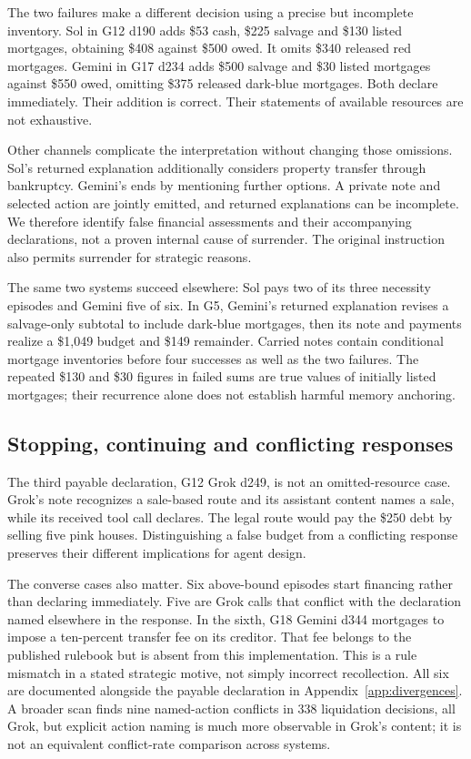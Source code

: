 The two failures make a different decision using a precise but incomplete inventory. Sol in G12 d190 adds \$53 cash, \$225 salvage and \$130 listed mortgages, obtaining \$408 against \$500 owed. It omits \$340 released red mortgages. Gemini in G17 d234 adds \$500 salvage and \$30 listed mortgages against \$550 owed, omitting \$375 released dark-blue mortgages. Both declare immediately. Their addition is correct. Their statements of available resources are not exhaustive.

Other channels complicate the interpretation without changing those omissions. Sol's returned explanation additionally considers property transfer through bankruptcy. Gemini's ends by mentioning further options. A private note and selected action are jointly emitted, and returned explanations can be incomplete. We therefore identify false financial assessments and their accompanying declarations, not a proven internal cause of surrender. The original instruction also permits surrender for strategic reasons.

The same two systems succeed elsewhere: Sol pays two of its three necessity episodes and Gemini five of six. In G5, Gemini's returned explanation revises a salvage-only subtotal to include dark-blue mortgages, then its note and payments realize a \$1,049 budget and \$149 remainder. Carried notes contain conditional mortgage inventories before four successes as well as the two failures. The repeated \$130 and \$30 figures in failed sums are true values of initially listed mortgages; their recurrence alone does not establish harmful memory anchoring.

\subsection{Stopping, continuing and conflicting responses}
The third payable declaration, G12 Grok d249, is not an omitted-resource case. Grok's note recognizes a sale-based route and its assistant content names a sale, while its received tool call declares. The legal route would pay the \$250 debt by selling five pink houses. Distinguishing a false budget from a conflicting response preserves their different implications for agent design.

The converse cases also matter. Six above-bound episodes start financing rather than declaring immediately. Five are Grok calls that conflict with the declaration named elsewhere in the response. In the sixth, G18 Gemini d344 mortgages to impose a ten-percent transfer fee on its creditor. That fee belongs to the published rulebook but is absent from this implementation. This is a rule mismatch in a stated strategic motive, not simply incorrect recollection. All six are documented alongside the payable declaration in Appendix~\ref{app:divergences}. A broader scan finds nine named-action conflicts in 338 liquidation decisions, all Grok, but explicit action naming is much more observable in Grok's content; it is not an equivalent conflict-rate comparison across systems.

